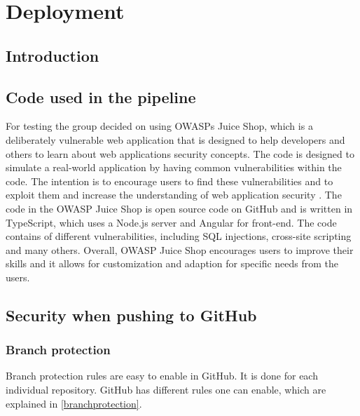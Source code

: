 \chapter{Deployment}
\section{Introduction}
\section{Code used in the pipeline}
For testing the group decided on using OWASPs Juice Shop, which is a deliberately vulnerable web application that is designed to help developers and others to learn about web applications security concepts. The code is designed to simulate a real-world application by having common vulnerabilities within the code. The intention is to encourage users to find these vulnerabilities and to exploit them and increase the understanding of web application security \cite{owaspJuiceShop}.
The code in the OWASP Juice Shop is open source code on GitHub and is written in TypeScript, which uses a Node.js server and Angular for \gls{front-end}. \cite{owaspJuiceShopCode}
The code contains of different vulnerabilities, including SQL injections, cross-site scripting and many others. 
Overall, OWASP Juice Shop encourages users to improve their skills and it allows for customization and adaption for specific needs from the users. 

\section{Security when pushing to GitHub}


\subsection{Branch protection}
Branch protection rules are easy to enable in GitHub. It is done for each individual repository. GitHub has different rules one can enable, which are explained in \ref{branchprotection}.

